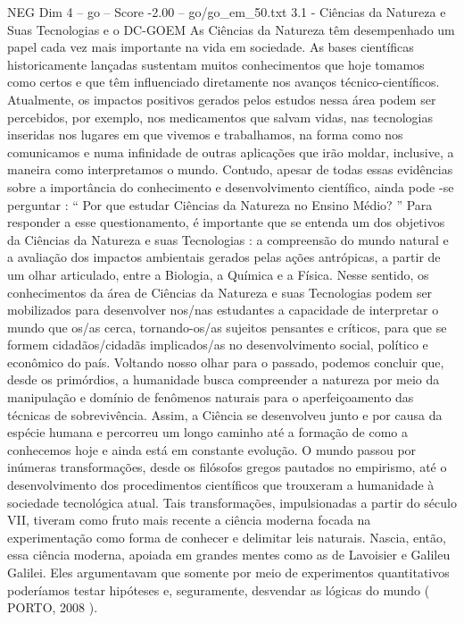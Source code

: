 \begin{textsample}{NEG Dim 4 – go – Score -2.00 – go/go\_em\_50.txt}  \label{ex:f4_neg_227}
3.1 - Ciências da Natureza e Suas Tecnologias e o DC-GOEM As Ciências da Natureza têm desempenhado um papel cada vez mais importante na vida em sociedade.
As bases científicas historicamente lançadas sustentam muitos conhecimentos que hoje tomamos como certos e que têm influenciado diretamente nos avanços técnico-científicos.
Atualmente, os impactos positivos gerados pelos estudos nessa área podem ser percebidos, por exemplo, nos medicamentos que salvam vidas, nas tecnologias inseridas nos lugares em que vivemos e trabalhamos, na forma como nos comunicamos e numa infinidade de outras aplicações que irão moldar, inclusive, a maneira como interpretamos o mundo.
Contudo, apesar de todas essas evidências sobre a importância do conhecimento e desenvolvimento científico, ainda pode -se perguntar : “ Por que estudar Ciências da Natureza no Ensino Médio? ” Para responder a esse questionamento, é importante que se entenda um dos objetivos da Ciências da Natureza e suas Tecnologias : a compreensão do mundo natural e a avaliação dos impactos ambientais gerados pelas ações antrópicas, a partir de um olhar articulado, entre a Biologia, a Química e a Física.
Nesse sentido, os conhecimentos da área de Ciências da Natureza e suas Tecnologias podem ser mobilizados para desenvolver nos/nas estudantes a capacidade de interpretar o mundo que os/as cerca, tornando-os/as sujeitos pensantes e críticos, para que se formem cidadãos/cidadãs implicados/as no desenvolvimento social, político e econômico do país.
Voltando nosso olhar para o passado, podemos concluir que, desde os primórdios, a humanidade busca compreender a natureza por meio da manipulação e domínio de fenômenos naturais para o aperfeiçoamento das técnicas de sobrevivência.
Assim, a Ciência se desenvolveu junto e por causa da espécie humana e percorreu um longo caminho até a formação de como a conhecemos hoje e ainda está em constante evolução.
O mundo passou por inúmeras transformações, desde os filósofos gregos pautados no empirismo, até o desenvolvimento dos procedimentos científicos que trouxeram a humanidade à sociedade tecnológica atual.
Tais transformações, impulsionadas a partir do século VII, tiveram como fruto mais recente a ciência moderna focada na experimentação como forma de conhecer e delimitar leis naturais.
Nascia, então, essa ciência moderna, apoiada em grandes mentes como as de Lavoisier e Galileu Galilei.
Eles argumentavam que somente por meio de experimentos quantitativos poderíamos testar hipóteses e, seguramente, desvendar as lógicas do mundo ( PORTO, 2008 ).

\end{textsample}
